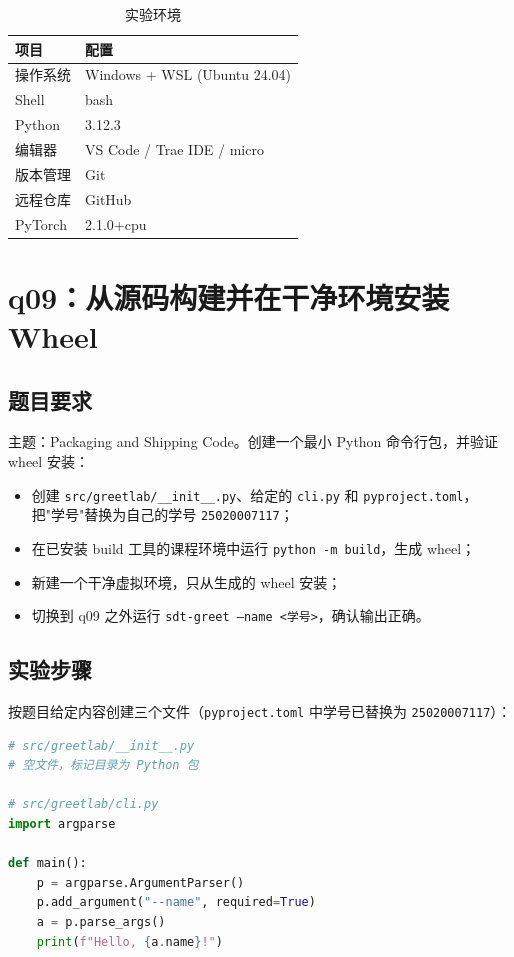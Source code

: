 \documentclass[a4paper,11pt]{ctexart}
\begin{document}
\begin{table}[htbp]
  \centering
  \caption{实验环境}\label{tab:env}
  \begin{tabular}{ll}
    \toprule
    项目 & 配置 \\
    \midrule
    操作系统 & Windows + WSL (Ubuntu 24.04) \\
    Shell & bash \\
    Python & 3.12.3 \\
    编辑器 & VS Code / Trae IDE / micro \\
    版本管理 & Git \\
    远程仓库 & GitHub \\
    PyTorch & 2.1.0+cpu \\
    \bottomrule
  \end{tabular}
\end{table}

\section{q09：从源码构建并在干净环境安装 Wheel}

\subsection{题目要求}

主题：Packaging and Shipping Code。创建一个最小 Python 命令行包，并验证 wheel 安装：
\begin{itemize}
  \item 创建 \texttt{src/greetlab/\_\_init\_\_.py}、给定的 \texttt{cli.py} 和 \texttt{pyproject.toml}，
        把"学号"替换为自己的学号 \texttt{25020007117}；
  \item 在已安装 build 工具的课程环境中运行 \texttt{python -m build}，生成 wheel；
  \item 新建一个干净虚拟环境，只从生成的 wheel 安装；
  \item 切换到 q09 之外运行 \texttt{sdt-greet --name <学号>}，确认输出正确。
\end{itemize}

\subsection{实验步骤}

按题目给定内容创建三个文件（\texttt{pyproject.toml} 中学号已替换为 \texttt{25020007117}）：

\begin{lstlisting}[language=Python]
# src/greetlab/__init__.py
# 空文件，标记目录为 Python 包

# src/greetlab/cli.py
import argparse

def main():
    p = argparse.ArgumentParser()
    p.add_argument("--name", required=True)
    a = p.parse_args()
    print(f"Hello, {a.name}!")
\end{lstlisting}
\end{document}
